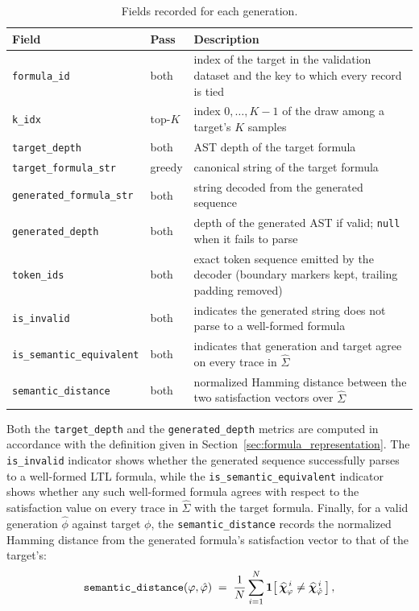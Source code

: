 \documentclass[titlepage,a4paper,11pt]{report}
\begin{document}
    \begin{table}[ht]
        \centering
        \caption{Fields recorded for each generation.}
        \label{tab:validation_record_schema}
        \begin{tabular}{l l p{7.4cm}}
            \toprule
            Field & Pass & Description \\
            \midrule
            \texttt{formula\_id}                & both    & index of the target in the validation dataset and the key to which every record is tied \\
            \texttt{k\_idx}                     & top-$K$ & index $0,\dots,K{-}1$ of the draw among a target's $K$ samples \\
            \texttt{target\_depth}              & both    & AST depth of the target formula \\
            \texttt{target\_formula\_str}       & greedy  & canonical string of the target formula \\
            \texttt{generated\_formula\_str}    & both    & string decoded from the generated sequence \\
            \texttt{generated\_depth}           & both    & depth of the generated AST if valid; \texttt{null} when it fails to parse \\
            \texttt{token\_ids}                 & both    & exact token sequence emitted by the decoder (boundary markers kept, trailing padding removed) \\
            \texttt{is\_invalid}                & both    & indicates the generated string does not parse to a well-formed formula \\
            \texttt{is\_semantic\_equivalent}   & both    & indicates that generation and target agree on every trace in $\widehat\Sigma$ \\
            \texttt{semantic\_distance}         & both    & normalized Hamming distance between the two satisfaction vectors over $\widehat\Sigma$ \\
            \bottomrule
        \end{tabular}
    \end{table}

    Both the \texttt{target\_depth} and the \texttt{generated\_depth} metrics are computed in accordance with the definition given in Section~\ref{sec:formula_representation}. The \texttt{is\_invalid} indicator shows whether the generated sequence successfully parses to a well-formed LTL formula, while the \texttt{is\_semantic\_equivalent} indicator shows whether any such well-formed formula agrees with respect to the satisfaction value on every trace in $\widehat{\Sigma}$ with the target formula. Finally, for a valid generation $\hat\phi$ against target $\phi$, the \texttt{semantic\_distance} records the normalized Hamming distance from the generated formula's satisfaction vector to that of the target's:
    \begin{equation}
        \texttt{semantic\_distance}(\varphi, \hat{\varphi}) \;=\; \frac{1}{N}\sum_{i=1}^{N} \mathbf{1}\!\left[\,\bm{\widehat\chi}_{\varphi}^{\,i} \neq \bm{\widehat\chi}_{\hat{\varphi}}^{\,i}\,\right],
        \label{eq:semantic_distance}
    \end{equation}
\end{document}
